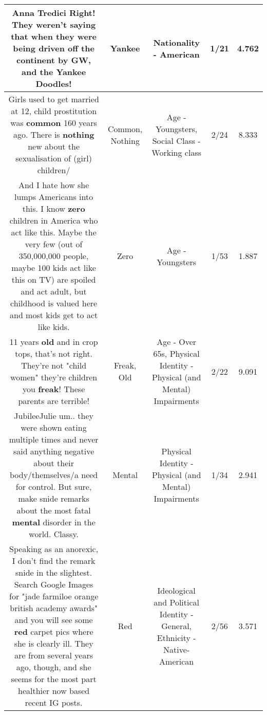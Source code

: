 \documentclass[11pt]{article}
\newlength\mylength
\begin{document}
\begin{center}
\begin{longtable}{|C{.65\mylength}|C{.30\mylength}|C{.12\mylength}|C{.12\mylength}|C{.12\mylength}|}
  \small Anna Tredici Right! They weren't saying that when they were being driven off the continent by GW, and the \textbf{Yankee} Doodles!\normalsize   & Yankee & Nationality - American & 1/21 & 4.762 \\  \hline
  \small Girls used to get married at 12, child prostitution was \textbf{common} 160 years ago. There is \textbf{nothing} new about the sexualisation of (girl) children/\normalsize   & Common, Nothing & Age - Youngsters, Social Class - Working class & 2/24 & 8.333 \\  \hline
  \small And I hate how she lumps Americans into this. I know \textbf{zero} children in America who act like this. Maybe the very few (out of 350,000,000 people, maybe 100 kids act like this on TV) are spoiled and act adult, but childhood is valued here and most kids get to act like kids.\normalsize   & Zero & Age - Youngsters & 1/53 & 1.887 \\  \hline
  \small 11 years \textbf{old} and in crop tops, that's not right. They're not "child women" they're children you \textbf{freak}! These parents are terrible!\normalsize   & Freak, Old & Age - Over 65s, Physical Identity - Physical (and Mental) Impairments & 2/22 & 9.091 \\  \hline
  \small JubileeJulie um.. they were shown eating multiple times and never said anything negative about their body/themselves/a need for control. But sure, make snide remarks about the most fatal \textbf{mental} disorder in the world. Classy.\normalsize   & Mental & Physical Identity - Physical (and Mental) Impairments & 1/34 & 2.941 \\  \hline
  \small Speaking as an anorexic, I don't find the remark snide in the slightest. Search Google Images for "jade farmiloe orange british academy awards" and you will see some \textbf{r\textbf{ed}} carpet pics where she is clearly ill. They are from several years ago, though, and she seems for the most part healthier now based recent IG posts.\normalsize   & Red &  Ideological and Political Identity - General, Ethnicity - Native-American & 2/56 & 3.571 \\  \hline

\end{longtable}
\end{center}
\end{document}
